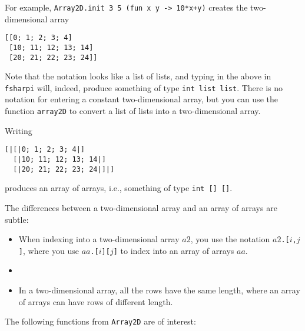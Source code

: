 \documentclass[a4paper]{article}
\begin{document}
For example, \texttt{Array2D.init 3 5 (fun x y -> 10*x+y)} creates the
two-dimensional array

\begin{verbatim}
[[0; 1; 2; 3; 4]
 [10; 11; 12; 13; 14]
 [20; 21; 22; 23; 24]]
\end{verbatim}

\noindent
Note that the notation looks like a list of lists, and typing in the
above in \texttt{fsharpi} will, indeed, produce something of type
\texttt{int~list~list}.  There is no notation for entering a constant
two-dimensional array, but you can use the function \texttt{array2D}
to convert a list of lists into a two-dimensional array.

Writing

\begin{verbatim}
[|[|0; 1; 2; 3; 4|]
  [|10; 11; 12; 13; 14|]
  [|20; 21; 22; 23; 24|]|]
\end{verbatim}

\noindent
produces an array of arrays, i.e., something of type
\texttt{int~[]~[]}.

The differences between a two-dimensional array and an array of arrays
are subtle:

\begin{itemize}
\item When indexing into a two-dimensional array $a2$, you use the notation
  \texttt{$a2$.[$i$,$j$]}, where you use \texttt{$aa$.[$i$][$j$]} to
  index into an array of arrays $aa$.
\item 
\item In a two-dimensional array, all the rows have the same length,
  where an array of arrays can have rows of different length.
\end{itemize}

\noindent
The following functions from \texttt{Array2D} are of interest:
\end{document}
